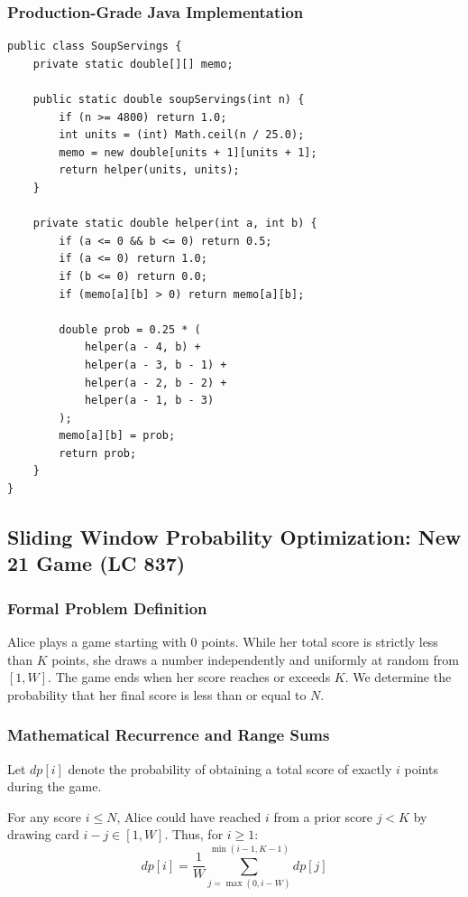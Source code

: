 \documentclass[10pt,journal,compsoc,onecolumn]{IEEEtran}
\begin{document}
\subsubsection{Production-Grade Java Implementation}

\begin{verbatim}
public class SoupServings {
    private static double[][] memo;

    public static double soupServings(int n) {
        if (n >= 4800) return 1.0;
        int units = (int) Math.ceil(n / 25.0);
        memo = new double[units + 1][units + 1];
        return helper(units, units);
    }

    private static double helper(int a, int b) {
        if (a <= 0 && b <= 0) return 0.5;
        if (a <= 0) return 1.0;
        if (b <= 0) return 0.0;
        if (memo[a][b] > 0) return memo[a][b];

        double prob = 0.25 * (
            helper(a - 4, b) +
            helper(a - 3, b - 1) +
            helper(a - 2, b - 2) +
            helper(a - 1, b - 3)
        );
        memo[a][b] = prob;
        return prob;
    }
}
\end{verbatim}

\subsection{Sliding Window Probability Optimization: New 21 Game (LC 837)}

\subsubsection{Formal Problem Definition}
Alice plays a game starting with 0 points. While her total score is strictly less than $K$ points, she draws a number independently and uniformly at random from $[1, W]$. The game ends when her score reaches or exceeds $K$. We determine the probability that her final score is less than or equal to $N$.

\subsubsection{Mathematical Recurrence and Range Sums}
Let $dp[i]$ denote the probability of obtaining a total score of exactly $i$ points during the game.

For any score $i \le N$, Alice could have reached $i$ from a prior score $j < K$ by drawing card $i - j \in [1, W]$.
Thus, for $i \ge 1$:
\begin{equation}
dp[i] = \frac{1}{W} \sum_{j = \max(0, i - W)}^{\min(i - 1, K - 1)} dp[j]
\label{eq:new-21-rec}
\end{equation}
\end{document}
